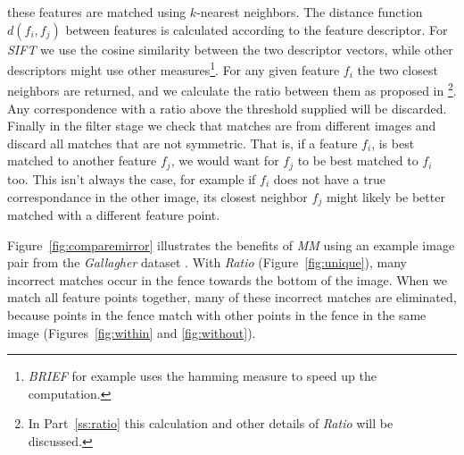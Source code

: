 these features are matched using $k$-nearest neighbors.  The distance 
function $d(f_i, f_j)$ between features is calculated according to the 
feature descriptor. For \emph{SIFT} we use the cosine similarity between 
the two descriptor vectors, while other descriptors might use other 
measures\footnote{\emph{BRIEF} for example uses the hamming measure to 
speed up the computation.}.  For any given feature $f_i$ the two closest 
neighbors are returned, and we calculate the ratio between them as 
proposed in \cite{lowe2004sift}\footnote{In Part~\ref{ss:ratio} this 
calculation and other details of \emph{Ratio} will be discussed.}.  Any 
correspondence with a ratio above the threshold supplied will be 
discarded. Finally in the filter stage we check that matches are from 
different images and discard all matches that are not symmetric. That 
is, if a feature $f_i$, is best matched to another feature $f_j$, we 
would want for $f_j$ to be best matched to $f_i$ too.
This isn't always the case, for example if $f_i$ does not have a true 
correspondance in the other image, its closest neighbor $f_j$ might 
likely be better matched with a different feature point.

Figure~\ref{fig:comparemirror} illustrates the benefits of \emph{MM} 
using an example image pair from the \emph{Gallagher} dataset 
\cite{gallagher2008}.
With \emph{Ratio} (Figure~\ref{fig:unique}), many incorrect matches occur 
in the fence towards the bottom of the image.
When we match all feature points together, many of these incorrect 
matches are eliminated, because points in the fence match with other 
points in the fence in the same image (Figures~\ref{fig:within} and
\ref{fig:without}).
%
